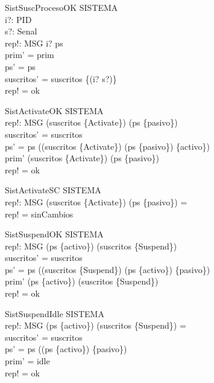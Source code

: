 \begin{schema}{SistSuscProcesoOK}
  \Delta SISTEMA\\
  i?: PID\\
  s?: Senal\\
  rep!: MSG
\where
  i? \in  \dom  ps\\
  prim' = prim\\
  ps' = ps\\
  suscritos' = suscritos \cup  \{(i? \mapsto  s?)\}\\
  rep! = ok
\end{schema}

\begin{schema}{SistActivateOK}
  \Delta SISTEMA\\
  rep!: MSG
\where
  \dom  (suscritos \rres  \{Activate\}) \cap  \dom  (ps \rres  \{pasivo\}) \neq  \emptyset\\
  suscritos' = suscritos\\
  ps' = ps \oplus  (\dom  (suscritos \rres  \{Activate\}) \cap  \dom  (ps \rres  \{pasivo\}) \cross  \{activo\})\\
  prim' \in  \dom  (suscritos \rres  \{Activate\}) \cap  \dom  (ps \rres  \{pasivo\})\\
  rep! = ok
\end{schema}

\begin{schema}{SistActivateSC}
  \Xi SISTEMA\\
  rep!: MSG
\where
  \dom  (suscritos \rres  \{Activate\}) \cap  \dom  (ps \rres  \{pasivo\}) = \emptyset\\
  rep! = sinCambios
\end{schema}

\begin{schema}{SistSuspendOK}
  \Delta SISTEMA\\
  rep!: MSG
\where
  \dom  (ps \rres  \{activo\}) \setminus  \dom  (suscritos \rres  \{Suspend\}) \neq  \emptyset\\
  suscritos' = suscritos\\
  ps' = ps \oplus  (\dom  (suscritos \rres  \{Suspend\}) \cap  \dom  (ps \rres  \{activo\}) \cross  \{pasivo\})\\
  prim' \in  \dom  (ps \rres  \{activo\}) \setminus  \dom  (suscritos \rres  \{Suspend\})\\
  rep! = ok
\end{schema}

\begin{schema}{SistSuspendIdle}
  \Delta SISTEMA\\
  rep!: MSG
\where
  \dom  (ps \rres  \{activo\}) \setminus  \dom  (suscritos \rres  \{Suspend\}) = \emptyset\\
  suscritos' = suscritos\\
  ps' = ps \oplus  (\dom  (ps \rres  \{activo\}) \cross  \{pasivo\})\\
  prim' = idle\\
  rep! = ok
\end{schema}

